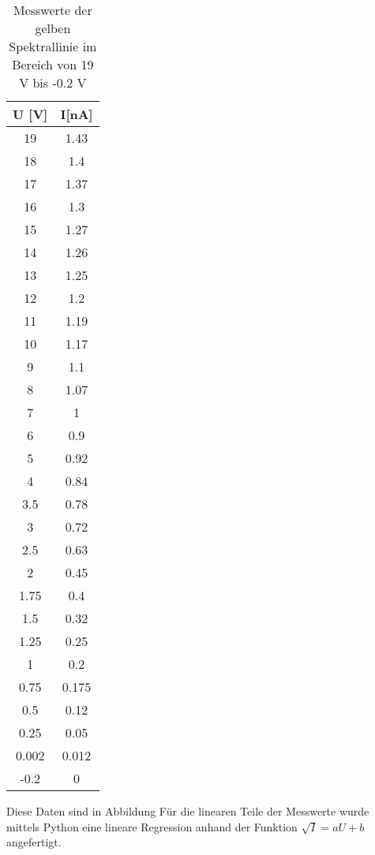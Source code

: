   \begin{table}[H]
    \centering
    \caption{Messwerte der gelben Spektrallinie im Bereich von 19 V bis -0.2 V}
    \label{tab:idle}
    \begin{tabular}{c c}
     \toprule
      U [V]& I[nA]\\
      \midrule
       19     & 1.43  \\
       18     & 1.4   \\
       17     & 1.37  \\
       16     & 1.3   \\
       15     & 1.27  \\
       14     & 1.26  \\
       13     & 1.25  \\
       12     & 1.2   \\
       11     & 1.19  \\
       10     & 1.17  \\
        9     & 1.1   \\
        8     & 1.07  \\
        7     & 1     \\
        6     & 0.9   \\
        5     & 0.92  \\
        4     & 0.84  \\
        3.5   & 0.78  \\
        3     & 0.72  \\
        2.5   & 0.63  \\
        2     & 0.45  \\
        1.75  & 0.4   \\
        1.5   & 0.32  \\
        1.25  & 0.25  \\
        1     & 0.2   \\
        0.75  & 0.175 \\
        0.5   & 0.12  \\
        0.25  & 0.05  \\
        0.002 & 0.012 \\
       -0.2   & 0     \\
     \bottomrule
    \end{tabular}
  \end{table} 
  Diese Daten sind in Abbildung %
  Für die linearen Teile der Messwerte wurde mittels Python eine lineare Regression 
  anhand der Funktion $\sqrt{I}=aU+b$ angefertigt.

